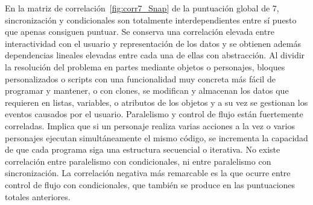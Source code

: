 \documentclass[a4paper, 12pt]{book}
\begin{document}
En la matriz de correlación~\ref{fig:corr7_Snap} de la puntuación global de 7, sincronización y condicionales son totalmente interdependientes entre sí puesto que apenas consiguen puntuar. Se conserva una correlación elevada entre interactividad con el usuario y representación de los datos y se obtienen además dependencias lineales elevadas entre cada una de ellas con abstracción. Al dividir la resolución del problema en partes mediante objetos o personajes, bloques personalizados o scripts con una funcionalidad muy concreta más fácil de programar y mantener, o con clones, se modifican y almacenan los datos que requieren en listas, variables, o atributos de los objetos y a su vez se gestionan los eventos causados por el usuario. Paralelismo y control de flujo están fuertemente correladas. Implica que si un personaje realiza varias acciones a la vez o varios personajes ejecutan simultáneamente el mismo código, se incrementa la capacidad de que cada programa siga una estructura secuencial o iterativa. No existe correlación entre paralelismo con condicionales, ni entre paralelismo con sincronización. La correlación negativa más remarcable es la que ocurre entre control de flujo con condicionales, que también se produce en las puntuaciones totales anteriores.
\end{document}
